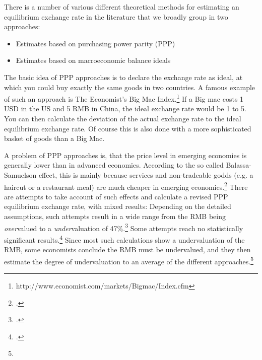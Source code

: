 \documentclass[11pt]{article}
\begin{document}


There is a number of various different theoretical methods for estimating an 
equilibrium exchange rate in the literature that we broadly group in two approaches:

\begin{itemize}
\item{Estimates based on purchasing power parity (PPP)}
\item{Estimates based on macroeconomic balance ideals}
\end{itemize}


The basic idea of PPP approaches is to declare the exchange rate as ideal, at which you could buy exactly the same goods in two countries. A famous example of such an approach is The Economist's Big Mac Index.\footnote{http://www.economist.com/markets/Bigmac/Index.cfm} If a Big mac costs 1 USD in the US and 5 RMB in China, the ideal exchange rate would be 1 to 5. You can then calculate the deviation of the actual exchange rate to the ideal equilibrium exchange rate. Of course this is also done with a more sophisticated basket of goods than a Big Mac. 

A problem of PPP approaches is, that the price level in emerging economies is generally lower than in advanced economies. According to the so called Balassa-Samuelson effect, this is mainly because services and non-tradeable godds (e.g. a haircut or a restaurant meal) are much cheaper in emerging economics.\footnote{\cite[pp. 82]{CheungChinn2010}.} There are attempts to take account of such effects and calculate a revised PPP equilibrium exchange rate, with mixed results: Depending on the detailed assumptions, such attempts result in a wide range from the RMB being \emph{over}valued to a \emph{under}valuation of 47\%.\footnote{\cite[pp. 72]{Subramanian}.} Some attempts reach no statistically significant results.\footnote{\cite[p. 83]{CheungChinn2010}.} Since most such calculations show a undervaluation of the RMB, some economists conclude the RMB must be undervalued, and they then estimate the degree of undervaluation to an average of the different approaches.\footnote{}%
\end{document}
